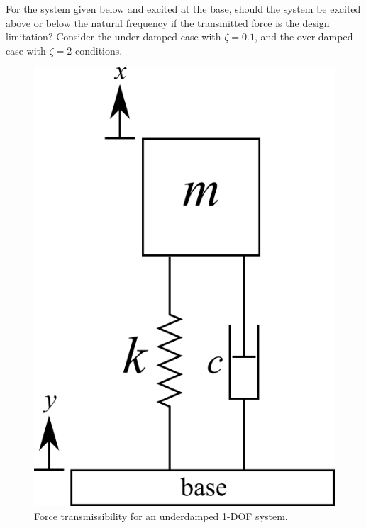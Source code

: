 \documentclass[12pt,letter]{article}
\begin{document}
		\begin{example}
			
			For the system given below and excited at the base, should the system be excited above or below the natural frequency if the transmitted force is the design limitation? Consider the under-damped case with $\zeta=0.1$, and the over-damped case with $\zeta=2$ conditions. 

			\begin{figure}[H]
				\centering
				\includegraphics[]{../figures/1_DOF_spring_dashpot_mass_vertical_base_excited.png}
				\caption{Force transmissibility for an underdamped 1-DOF system.}
			\end{figure}		
		

\end{example}
\end{document}
